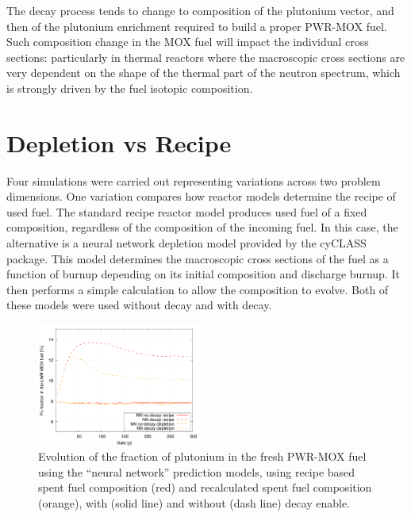 \documentclass{anstrans}
\begin{document}
The decay process tends to change to composition of the plutonium vector, and
then of the plutonium enrichment required to build a proper PWR-MOX fuel.  Such
composition change in the MOX fuel will impact the individual cross sections:
particularly in thermal reactors where the macroscopic cross sections are very
dependent on the shape of the thermal part of the neutron spectrum, which is
strongly driven by the fuel isotopic composition.


\section{Depletion vs Recipe}

Four simulations were carried out representing variations across two problem
dimensions.  One variation compares how reactor models determine the recipe of
used fuel.  The standard recipe reactor model produces used fuel of a fixed
composition, regardless of the composition of the incoming fuel.  In this case, the
alternative is a neural network depletion model provided by the cyCLASS
package.  This model determines the macroscopic cross sections of the fuel as a
function of burnup depending on its initial composition and discharge burnup. It then
performs a simple calculation to allow the composition to evolve. Both of these models were used
without decay and with decay.

\begin{figure}[ht] %
  \centering
  \includegraphics[width=0.48\textwidth]{irradiation_pu_contribution.png}
  \caption{Evolution of the fraction of plutonium in the fresh PWR-MOX fuel
    using the ``neural network'' prediction models, using recipe based spent
    fuel composition (red) and recalculated spent fuel composition (orange),
    with (solid line) and without (dash line) decay enable.}
  \label{fig:depletion}
\end{figure}
\end{document}
